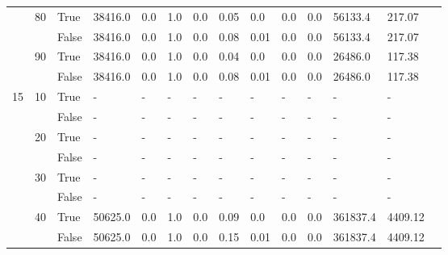 \begin{appendices}
\begin{landscape}
\begin{small}
\begin{longtable}[c]{@{}lll|ll|ll|ll|ll|lll@{}}
   & 80 & True  & 38416.0         & 0.0            & 1.0           & 0.0           & 0.05          & 0.0           & 0.0           & 0.0           & 56133.4       & 217.07      &  \\
   &    & False & 38416.0         & 0.0            & 1.0           & 0.0           & 0.08          & 0.01          & 0.0           & 0.0           & 56133.4       & 217.07      &  \\
   & 90 & True  & 38416.0         & 0.0            & 1.0           & 0.0           & 0.04          & 0.0           & 0.0           & 0.0           & 26486.0       & 117.38      &  \\
   &    & False & 38416.0         & 0.0            & 1.0           & 0.0           & 0.08          & 0.01          & 0.0           & 0.0           & 26486.0       & 117.38      &  \\
  \midrule
15 & 10 & True  & -               & -              & -             & -             & -             & -             & -             & -             & -             & -           &  \\
   &    & False & -               & -              & -             & -             & -             & -             & -             & -             & -             & -           &  \\
   & 20 & True  & -               & -              & -             & -             & -             & -             & -             & -             & -             & -           &  \\
   &    & False & -               & -              & -             & -             & -             & -             & -             & -             & -             & -           &  \\
   & 30 & True  & -               & -              & -             & -             & -             & -             & -             & -             & -             & -           &  \\
   &    & False & -               & -              & -             & -             & -             & -             & -             & -             & -             & -           &  \\
   & 40 & True  & 50625.0         & 0.0            & 1.0           & 0.0           & 0.09          & 0.0           & 0.0           & 0.0           & 361837.4      & 4409.12     &  \\
   &    & False & 50625.0         & 0.0            & 1.0           & 0.0           & 0.15          & 0.01          & 0.0           & 0.0           & 361837.4      & 4409.12     &  \\

\end{longtable}
\end{small}
\end{landscape}
\end{appendices}
